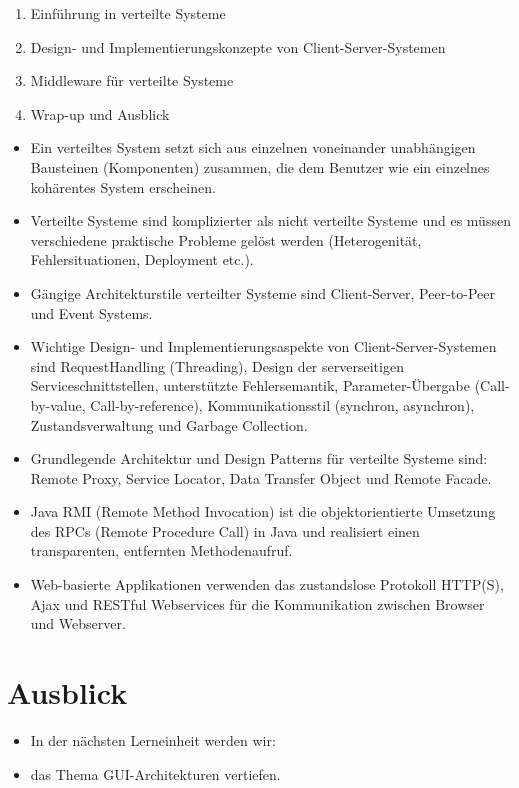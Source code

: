 \documentclass[10pt]{article}
\begin{document}
\begin{enumerate}
  \item Einführung in verteilte Systeme
  \item Design- und Implementierungskonzepte von Client-Server-Systemen
  \item Middleware für verteilte Systeme
  \item Wrap-up und Ausblick
\end{enumerate}

\begin{itemize}
  \item Ein verteiltes System setzt sich aus einzelnen voneinander unabhängigen Bausteinen (Komponenten) zusammen, die dem Benutzer wie ein einzelnes kohärentes System erscheinen.
  \item Verteilte Systeme sind komplizierter als nicht verteilte Systeme und es müssen verschiedene praktische Probleme gelöst werden (Heterogenität, Fehlersituationen, Deployment etc.).
  \item Gängige Architekturstile verteilter Systeme sind Client-Server, Peer-to-Peer und Event Systems.
  \item Wichtige Design- und Implementierungsaspekte von Client-Server-Systemen sind RequestHandling (Threading), Design der serverseitigen Serviceschnittstellen, unterstützte Fehlersemantik, Parameter-Übergabe (Call-by-value, Call-by-reference), Kommunikationsstil (synchron, asynchron), Zustandsverwaltung und Garbage Collection.
  \item Grundlegende Architektur und Design Patterns für verteilte Systeme sind: Remote Proxy, Service Locator, Data Transfer Object und Remote Facade.
  \item Java RMI (Remote Method Invocation) ist die objektorientierte Umsetzung des RPCs (Remote Procedure Call) in Java und realisiert einen transparenten, entfernten Methodenaufruf.
  \item Web-basierte Applikationen verwenden das zustandslose Protokoll HTTP(S), Ajax und RESTful Webservices für die Kommunikation zwischen Browser und Webserver.
\end{itemize}

\section*{Ausblick}
\begin{itemize}
  \item In der nächsten Lerneinheit werden wir:
  \item das Thema GUI-Architekturen vertiefen.
\end{itemize}
\end{document}
